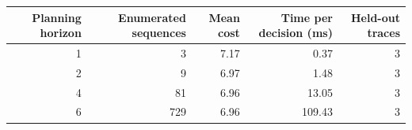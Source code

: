 \begin{tabular}{rrrrr}
\toprule
Planning horizon & Enumerated sequences & Mean cost & Time per decision (ms) & Held-out traces \\
\midrule
1 & 3 & 7.17 & 0.37 & 3 \\
2 & 9 & 6.97 & 1.48 & 3 \\
4 & 81 & 6.96 & 13.05 & 3 \\
6 & 729 & 6.96 & 109.43 & 3 \\
\bottomrule
\end{tabular}